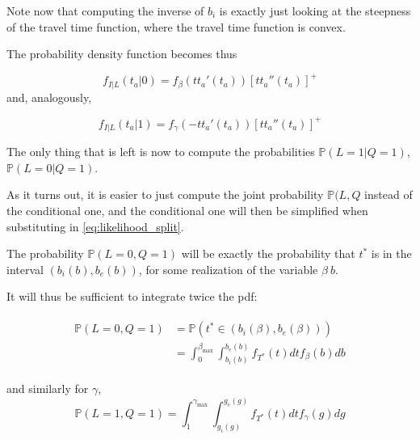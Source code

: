 \documentclass{article}
\begin{document}
Note now that computing the inverse of \(b_i\) is exactly just looking at the steepness of the travel time function, where the travel time function is convex.

The probability density function becomes thus

\begin{equation}
  \label{eq:pdf_early}
  f_{I | L}(t_a | 0) = f_\beta(tt_a'(t_a))[tt_a''(t_a)]^+
\end{equation}
and, analogously,

\begin{equation}
  \label{eq:pdf_late}
  f_{I | L}(t_a | 1) = f_\gamma(-tt_a'(t_a))[tt_a''(t_a)]^+
\end{equation}

The only thing that is left is now to compute the probabilities \(\mathbb{P}(L=1 | Q=1)\), \(\mathbb{P}(L=0 | Q=1)\).

As it turns out, it is easier to just compute the joint probability \(\mathbb{P}(L, Q\) instead of the conditional one, and the conditional one will then be simplified when substituting in \eqref{eq:likelihood_split}.

The probability \(\mathbb{P}(L=0, Q=1)\) will be exactly the probability that \(t^*\) is in the interval \((b_i(b), b_e(b))\), for some realization of the variable \(\beta\ b\).

It will thus be sufficient to integrate twice the pdf:

\begin{align}
  \label{eq:prob_int_beta}
  \begin{split}
    \mathbb{P}(L=0, Q=1) & =\mathbb{P}(t^* \in (b_i(\beta), b_e(\beta))) \\
    & = \int_0^{\beta_\text{max}}\int_{b_i(b)}^{b_e(b)} f_{T^*}(t)dtf_\beta(b)db
      \end{split}
\end{align}

and similarly for \(\gamma\),
\begin{equation}
  \label{eq:prob_in_gamma}
  \mathbb{P}(L=1, Q=1) = \int_1^{\gamma_\text{max}}\int_{g_i(g)}^{g_e(g)} f_{T^*}(t)dtf_\gamma(g)dg
\end{equation}
\end{document}
